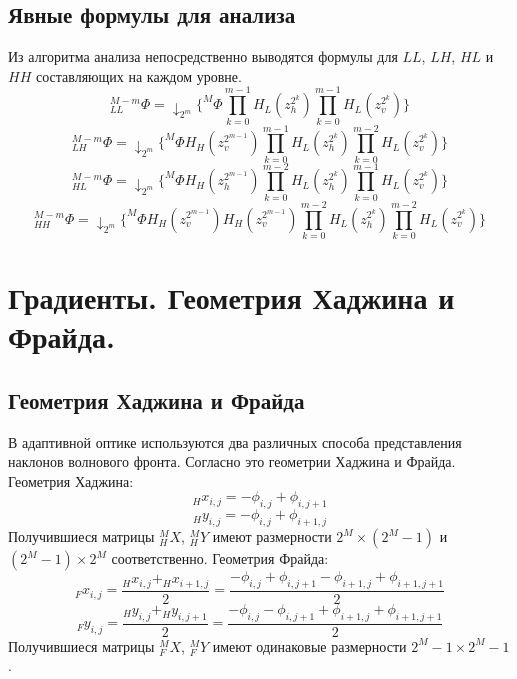 \documentclass[oneside, final, 14pt]{article}
\begin{document}
\subsection{Явные формулы для анализа}
Из алгоритма анализа непосредственно выводятся формулы для $LL$, $LH$, $HL$ и $HH$ составляющих на каждом уровне.
\begin{equation}\label{LL}
_{LL}^{M-m}\Phi=
\downarrow_{2^m} \{^M\Phi\prod\limits_{k = 0}^{m-1} H_L(z_h^{2^k})
							\prod\limits_{k = 0}^{m-1} H_L(z_v^{2^k})\}
\end{equation}
\begin{equation}\label{LH}
_{LH}^{M-m}\Phi=
\downarrow_{2^m} \{^M\Phi H_H(z_v^{2^{m-1}}) \prod\limits_{k = 0}^{m-1} H_L(z_h^{2^k})
							\prod\limits_{k = 0}^{m-2} H_L(z_v^{2^k})\}
\end{equation}
\begin{equation}\label{HL}
_{HL}^{M-m}\Phi=\downarrow_{2^m} \{^M\Phi H_H(z_h^{2^{m-1}}) \prod\limits_{k = 0}^{m-2} H_L(z_h^{2^k})
						\prod\limits_{k = 0}^{m-1} H_L(z_v^{2^k})\}
\end{equation}
\begin{equation}\label{HH}
_{HH}^{M-m}\Phi=\downarrow_{2^m} \{^M\Phi H_H(z_v^{2^{m-1}}) H_H(z_v^{2^{m-1}}) \prod\limits_{k = 0}^{m-2} H_L(z_h^{2^k})
							\prod\limits_{k = 0}^{m-2} H_L(z_v^{2^k})\}
\end{equation}
\section{Градиенты. Геометрия Хаджина и Фрайда.}
\subsection{Геометрия Хаджина и Фрайда}
В адаптивной оптике используются два различных способа представления наклонов волнового фронта. Согласно \cite{how}
это геометрии Хаджина и Фрайда.
Геометрия Хаджина:
$$_{H}x_{i,j}=-\phi_{i,j}+\phi_{i,j+1}$$
$$_{H}y_{i,j}=-\phi_{i,j}+\phi_{i+1,j}$$
Получившиеся матрицы $_H^{M}X$, $_H^{M}Y$ имеют размерности $2^M \times(2^M - 1)$ и $(2^M - 1) \times 2^M$ соответственно.
Геометрия Фрайда:
$$_{F}x_{i,j}=\frac{_{H}x_{i,j} + _{H}x_{i+1,j}}{2} = \frac{-\phi_{i,j}+\phi_{i,j+1}-\phi_{i+1,j}+\phi_{i+1,j+1}}{2}$$
$$_{F}y_{i,j}=\frac{_{H}y_{i,j} + _{H}y_{i,j+1}}{2} = \frac{-\phi_{i,j}-\phi_{i,j+1}+\phi_{i+1,j}+\phi_{i+1,j+1}}{2}$$
Получившиеся матрицы $_F^{M}X$, $_F^{M}Y$ имеют одинаковые размерности $2^M - 1 \times 2^M - 1$.
\end{document}

